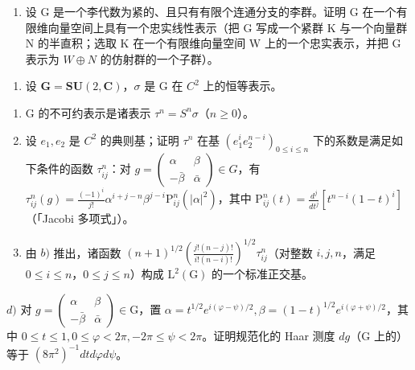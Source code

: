 \begin{enumerate}
\begin{enumerate}
\def\labelenumi{\arabic{enumi})}
\setcounter{enumi}{7}
\tightlist
\item
  设 G 是一个李代数为紧的、且只有有限个连通分支的李群。证明 G 在一个有限维向量空间上具有一个忠实线性表示（把 G 写成一个紧群 K 与一个向量群 N 的半直积；选取 K 在一个有限维向量空间 W 上的一个忠实表示，并把 G 表示为 \(W \oplus N\) 的仿射群的一个子群）。
\end{enumerate}


\begin{enumerate}
\def\labelenumi{\arabic{enumi})}
\tightlist
\item
  设 \(\mathbf{G} = \mathbf{SU}(2, \mathbf{C})\)，\(\sigma\) 是 G 在 \(C^{2}\) 上的恒等表示。
\end{enumerate}

\begin{enumerate}
\def\labelenumi{\alph{enumi})}
\item
  G 的不可约表示是诸表示 \(\tau^{n} = S^{n}\sigma\)（\(n \geq 0\)）。
\item
  设 \(e_{1}, e_{2}\) 是 \(C^{2}\) 的典则基；证明 \(\tau^{n}\) 在基 \((e_{1}^{i}e_{2}^{n-i})_{0\leq i\leq n}\) 下的系数是满足如下条件的函数 \(\tau_{ij}^{n}\)：对 \(g=\begin{pmatrix}\alpha&\beta\\-\bar{\beta}&\bar{\alpha}\end{pmatrix}\in G\)，有 \(\tau_{ij}^{n}(g)=\frac{(-1)^{i}}{j!}\alpha^{i+j-n}\beta^{j-i}\mathrm{P}_{ij}^{n}(|\alpha|^{2})\)，其中 \(\mathrm{P}_{ij}^{n}(t)=\frac{d^{j}}{dt^{j}}\left[t^{n-i}(1-t)^{i}\right]\)（「Jacobi 多项式」）。
\item
  由 \(b)\) 推出，诸函数 \((n + 1)^{1/2}\left(\frac{j!(n - j)!}{i!(n - i)!}\right)^{1/2}\tau_{ij}^n\)（对整数 \(i,j,n\)，满足 \(0\leq i\leq n\)，\(0\leq j\leq n\)）构成 \(\mathrm{L}^2 (\mathrm{G})\) 的一个标准正交基。
\end{enumerate}

\(d)\) 对 \(g = \left( \begin{array}{cc}\alpha & \beta \\ -\bar{\beta} & \bar{\alpha} \end{array} \right)\in \mathrm{G}\)，置 \(\alpha = t^{1 / 2}e^{i(\varphi -\psi) / 2},\beta = (1 - t)^{1 / 2}e^{i(\varphi +\psi) / 2}\)，其中 \(0\leq t\leq 1,0\leq \varphi < 2\pi , - 2\pi \leq \psi < 2\pi\)。证明规范化的 Haar 测度 \(dg\)（\(\mathrm{G}\) 上的）等于 \((8\pi^2)^{-1}dtd\varphi d\psi\)。


\end{enumerate}
